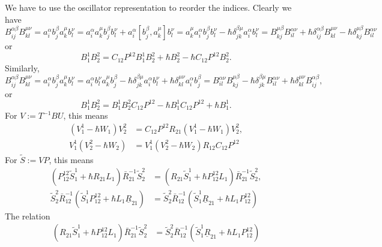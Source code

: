 \documentclass[11pt]{report}
\theoremstyle{definition}
\theoremstyle{remark}
\theoremstyle{remark}
\begin{document}
We have to use the oscillator representation to reorder the indices. Clearly we have
\begin{equation*}
B_{ij}^{\alpha\beta} B_{kl}^{\mu\nu}
= a_i^\alpha b_j^\beta a_k^\mu b_l^\nu
= a_i^\alpha a_k^\mu b_j^\beta b_l^\nu + a_i^\alpha [b_j^\beta,a_k^\mu] b_l^\nu
= a_k^\mu a_i^\alpha b_j^\beta b_l^\nu - \hbar \delta_{jk}^{\beta\mu} a_i^\alpha b_l^\nu
= B_{kj}^{\mu\beta} B_{il}^{\alpha\nu} + \hbar \delta_{ij}^{\alpha\beta} B_{kl}^{\mu\nu} - \hbar \delta_{kj}^{\mu\beta} B_{il}^{\alpha\nu}
\end{equation*}
or
\begin{equation*}
B_1^1 B_2^2 = C_{12} P^{12} B_1^1 B_2^2 + \hbar B_2^2 - \hbar C_{12} P^{12} B_2^2.
\end{equation*}
Similarly,
\begin{equation*}
B_{ij}^{\alpha\beta} B_{kl}^{\mu\nu}
= a_i^\alpha b_j^\beta a_k^\mu b_l^\nu
= a_i^\alpha b_l^\nu a_k^\mu b_j^\beta
- \hbar \delta_{jk}^{\beta\mu} a_i^\alpha b_l^\nu
+ \hbar \delta_{kl}^{\mu\nu} a_i^\alpha b_j^\beta
= B_{il}^{\alpha\nu} B_{kj}^{\mu\beta}
- \hbar \delta_{jk}^{\beta\mu} B_{il}^{\alpha\nu}
+ \hbar \delta_{kl}^{\mu\nu} B_{ij}^{\alpha\beta},
\end{equation*}
or
\begin{equation*}
B_1^1 B_2^2 = B_1^1 B_2^2 C_{12} P^{12} - \hbar B_1^1 C_{12} P^{12} + \hbar B_1^1.
\end{equation*}
For $V := T^{-1} B U$, this means
\begin{align*}
(V_1^1-\hbar W_1) V_2^2 &= C_{12} P^{12} R_{21} (V_1^1-\hbar W_1) V_2^2, \\
V_1^1 (V_2^2-\hbar W_2) &= V_1^1 (V_2^2-\hbar W_2) R_{12} C_{12} P^{12}
\end{align*}
For $\tilde S := VP$, this means
\begin{align*}
(P_{12}^{12} \tilde S_1^1 + \hbar R_{21} L_1) \bar R_{21}^{-1} \tilde S_2^2 &= (R_{21} \tilde S_1^1 + \hbar P_{12}^{12} L_1) \bar R_{21}^{-1} \tilde S_2^2, \\
\tilde S_2^2 \bar R_{12}^{-1} (\tilde S_1^1 P_{12}^{12} + \hbar L_1 \underline{R}_{21}) &= \tilde S_2^2 \bar R_{12}^{-1} (\tilde S_1^1 \underline{R}_{21} + \hbar L_1 P_{12}^{12})
\end{align*}
The relation
\begin{align*}
(R_{21} \tilde S_1^1 + \hbar P^{12}_{12} L_1) \bar R_{21}^{-1} \tilde S_2^2
&= \tilde S_2^2 \bar R_{12}^{-1} (\tilde S_1^1 \underline{R}_{21} + \hbar L_1 P^{12}_{12})
\end{align*}
\end{document}
